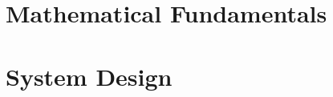 \appendix


\toclineskip
\section{Mathematical Fundamentals}


\newpage


\toclineskip
\section{System Design}


